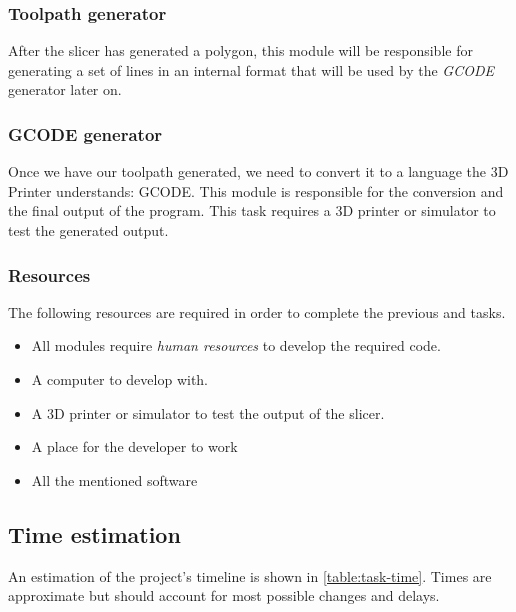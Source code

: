\subsubsection{Toolpath generator}
After the slicer has generated a polygon, this module will be responsible for generating a set of lines in an internal format that will be used by the \emph{GCODE} generator later on.

\subsubsection{GCODE generator}
Once we have our toolpath generated, we need to convert it to a language the 3D Printer understands: GCODE. This module is responsible for the conversion and the final output of the program. This task requires a 3D printer or simulator to test the generated output.



\subsubsection{Resources}

The following resources are required in order to complete the previous and tasks.

\begin{itemize}
    \item All modules require \emph{human resources} to develop the required code.
    \item A computer to develop with.
    \item A 3D printer or simulator to test the output of the slicer.
    \item A place for the developer to work
    \item All the mentioned software
\end{itemize}


\subsection{Time estimation}
An estimation of the project's timeline is shown in \autoref{table:task-time}. Times are approximate but should account for most possible changes and delays.

